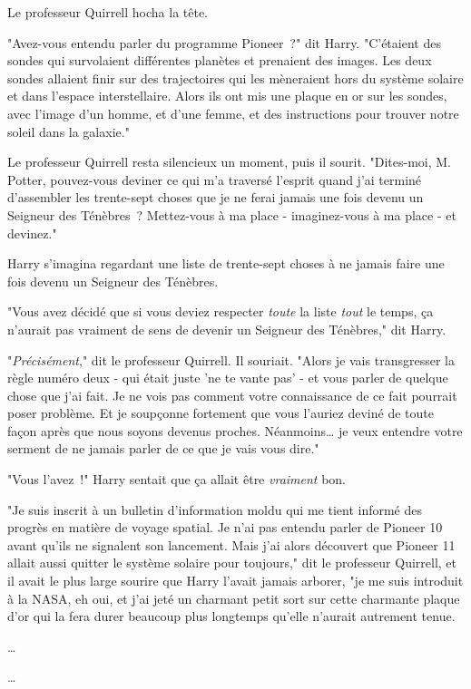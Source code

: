 Le professeur Quirrell hocha la tête.

"Avez-vous entendu parler du programme Pioneer~?" dit Harry. "C'étaient des sondes qui survolaient différentes planètes et prenaient des images. Les deux sondes allaient finir sur des trajectoires qui les mèneraient hors du système solaire et dans l'espace interstellaire. Alors ils ont mis une plaque en or sur les sondes, avec l'image d'un homme, et d'une femme, et des instructions pour trouver notre soleil dans la galaxie."

Le professeur Quirrell resta silencieux un moment, puis il sourit. "Dites-moi, M. Potter, pouvez-vous deviner ce qui m'a traversé l'esprit quand j'ai terminé d'assembler les trente-sept choses que je ne ferai jamais une fois devenu un Seigneur des Ténèbres~? Mettez-vous à ma place - imaginez-vous à ma place - et devinez."

Harry s'imagina regardant une liste de trente-sept choses à ne jamais faire une fois devenu un Seigneur des Ténèbres.

"Vous avez décidé que si vous deviez respecter \emph{toute} la liste \emph{tout} le temps, ça n'aurait pas vraiment de sens de devenir un Seigneur des Ténèbres," dit Harry.

"\emph{Précisément}," dit le professeur Quirrell. Il souriait. "Alors je vais transgresser la règle numéro deux - qui était juste 'ne te vante pas' - et vous parler de quelque chose que j'ai fait. Je ne vois pas comment votre connaissance de ce fait pourrait poser problème. Et je soupçonne fortement que vous l'auriez deviné de toute façon après que nous soyons devenus proches. Néanmoins… je veux entendre votre serment de ne jamais parler de ce que je vais vous dire."

"Vous l'avez~!" Harry sentait que ça allait être \emph{vraiment} bon.

"Je suis inscrit à un bulletin d'information moldu qui me tient informé des progrès en matière de voyage spatial. Je n'ai pas entendu parler de Pioneer 10 avant qu'ils ne signalent son lancement. Mais j'ai alors découvert que Pioneer 11 allait aussi quitter le système solaire pour toujours," dit le professeur Quirrell, et il avait le plus large sourire que Harry l'avait jamais arborer, "je me suis introduit à la NASA, eh oui, et j'ai jeté un charmant petit sort sur cette charmante plaque d'or qui la fera durer beaucoup plus longtemps qu'elle n'aurait autrement tenue.

…

…

